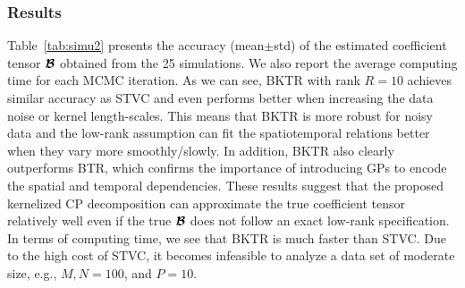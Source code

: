 \documentclass[12pt]{article}
\newcommand{\bd}[1]{\boldsymbol{#1}}
\begin{document}
\subsubsection{Results} 




Table~\ref{tab:simu2} presents the accuracy (mean$\pm$std) of the estimated coefficient tensor $\bd{\cal{B}}$ obtained from the 25 simulations. We also report the average computing time for each MCMC iteration. As we can see, BKTR with rank $R=10$ achieves similar accuracy as STVC and even performs better when increasing the data noise or kernel length-scales. This means that BKTR is more robust for noisy data and the low-rank assumption can fit the spatiotemporal relations better when they vary more smoothly/slowly. In addition, BKTR also clearly outperforms BTR, which confirms the importance of introducing GPs to encode the spatial and temporal dependencies. These results suggest that the proposed kernelized CP decomposition can approximate the true coefficient tensor relatively well even if the true $\bd{\cal{B}}$ does not follow an exact low-rank specification. In terms of computing time, we see that BKTR is much faster than STVC. Due to the high cost of STVC, it becomes infeasible to analyze a data set of moderate size, e.g., $M,N=100$, and $P=10$. 
\end{document}
